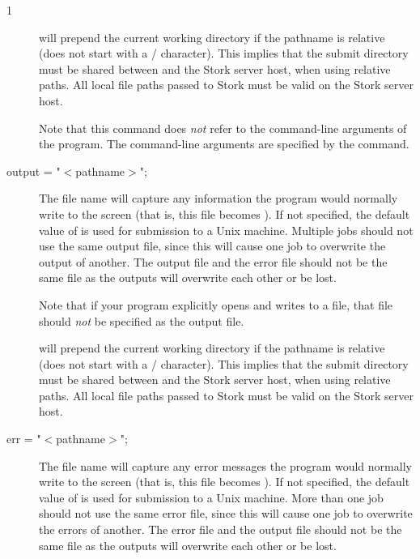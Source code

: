 \begin{ManPage}{\label{man-stork-submit}}{1}
\begin{description}
 will prepend the current working directory if the pathname is
relative (does not start with a / character).  This implies that the submit
directory must be shared between  and the Stork server host, when
using relative paths.  All local file paths passed to Stork must be valid on
the Stork server host.

Note that this command does \emph{not} refer to the command-line
arguments of the program.  The command-line arguments are specified by
the  command.


\item[output = "$<$pathname$>$";]
The  file name will capture
any information the program would normally write to the screen
(that is, this file becomes ).
If not specified, the default value of
 is used for submission to a Unix machine.
Multiple jobs should not use the same output
file, since this will cause one job to overwrite the output of
another.
The output file and the error file should not be the same file
as the outputs will overwrite each other or be lost.

Note that if your program explicitly opens and writes to a file,
that file should \emph{not} be specified as the output file.

 will prepend the current working directory if the pathname is
relative (does not start with a / character).  This implies that the submit
directory must be shared between  and the Stork server host, when
using relative paths.  All local file paths passed to Stork must be valid on
the Stork server host.


\item[err = "$<$pathname$>$";]
The  file name will capture any
error messages the program would normally write to the screen
(that is, this file becomes ).
If not specified, the default value of
 is used for submission to a Unix machine.
More than one job should not use the same error file, since
this will cause one job to overwrite the errors of another.
The error file and the output file should not be the same file
as the outputs will overwrite each other or be lost.


\end{description}
\end{ManPage}

